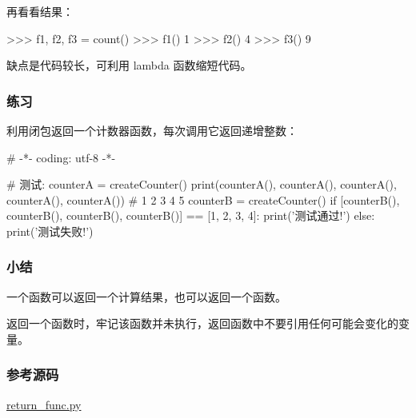 再看看结果：

\begin{pythoncode}
>>> f1, f2, f3 = count()
>>> f1()
1
>>> f2()
4
>>> f3()
9
\end{pythoncode}

缺点是代码较长，可利用 lambda 函数缩短代码。

\hypertarget{ux7ec3ux4e60}{%
\subsubsection{练习}\label{ux7ec3ux4e60}}

利用闭包返回一个计数器函数，每次调用它返回递增整数：

\begin{pythoncode}
# -*- coding: utf-8 -*-
\end{pythoncode}

\begin{pythoncode}
# 测试:
counterA = createCounter()
print(counterA(), counterA(), counterA(), counterA(), counterA()) # 1 2 3 4 5
counterB = createCounter()
if [counterB(), counterB(), counterB(), counterB()] == [1, 2, 3, 4]:
    print('测试通过!')
else:
    print('测试失败!')
\end{pythoncode}

\hypertarget{ux5c0fux7ed3}{%
\subsubsection{小结}\label{ux5c0fux7ed3}}

一个函数可以返回一个计算结果，也可以返回一个函数。

返回一个函数时，牢记该函数并未执行，返回函数中不要引用任何可能会变化的变量。

\hypertarget{ux53c2ux8003ux6e90ux7801}{%
\subsubsection{参考源码}\label{ux53c2ux8003ux6e90ux7801}}

\href{https://github.com/michaelliao/learn-python3/blob/master/samples/functional/return_func.py}{return\_func.py}

